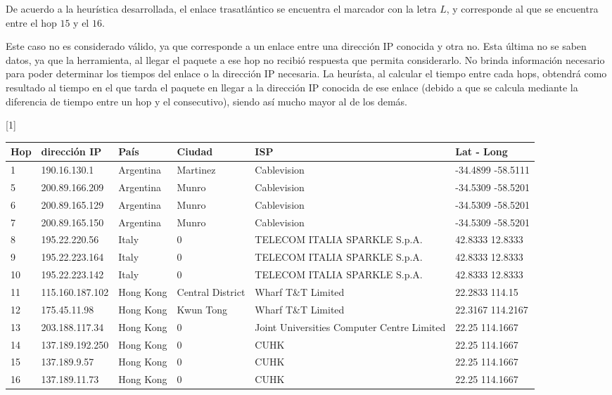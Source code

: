 De acuerdo a la heurística desarrollada, el enlace trasatlántico se encuentra el marcador con la letra $L$, y corresponde al que se encuentra entre el hop $15$ y el $16$. 

Este caso no es considerado válido, ya que corresponde a un enlace entre una dirección IP conocida y otra no. Esta última no se saben datos, ya que la herramienta, al llegar el paquete a ese hop no recibió respuesta que permita considerarlo. No brinda información necesario para poder determinar los tiempos del enlace o la dirección IP necesaria. La heurísta, al calcular el tiempo entre cada hops, obtendrá como resultado al tiempo en el que tarda el paquete en llegar a la dirección IP conocida de ese enlace (debido a que se calcula mediante la diferencia de tiempo entre un hop y el consecutivo), siendo así mucho mayor al de los demás. 


\begin{center}
\scalebox{0.7}[1]{
 \begin{tabular}{|l|l|l|l|l|l|}
    \hline 
    Hop & dirección IP & País & Ciudad & ISP & Lat - Long \\
    \hline
    1 & 190.16.130.1 & Argentina & Martinez & Cablevision & -34.4899 -58.5111	\\
    5 & 200.89.166.209 & Argentina & Munro & Cablevision & -34.5309 -58.5201	\\
    6 & 200.89.165.129 & Argentina & Munro & Cablevision & -34.5309 -58.5201	\\
    7 & 200.89.165.150 & Argentina & Munro & Cablevision & -34.5309 -58.5201	\\
    8 & 195.22.220.56 & Italy & 0 & TELECOM ITALIA SPARKLE S.p.A. & 42.8333 12.8333	\\
    9 & 195.22.223.164 & Italy & 0 & TELECOM ITALIA SPARKLE S.p.A. & 42.8333 12.8333	\\
    10 & 195.22.223.142 & Italy & 0 & TELECOM ITALIA SPARKLE S.p.A. & 42.8333 12.8333 \\
    11 & 115.160.187.102 & Hong Kong & Central District & Wharf T\&T Limited & 22.2833 114.15	\\
    12 & 175.45.11.98 & Hong Kong & Kwun Tong & Wharf T\&T Limited & 22.3167 114.2167	\\
    13 & 203.188.117.34 & Hong Kong & 0 & Joint Universities Computer Centre Limited & 22.25 114.1667	\\
    14 & 137.189.192.250 & Hong Kong & 0 & CUHK & 22.25 114.1667	\\
    15 & 137.189.9.57 & Hong Kong & 0 & CUHK & 22.25 114.1667	\\
    16 & 137.189.11.73 & Hong Kong & 0 & CUHK & 22.25 114.1667	\\
    \hline
 \end{tabular}}
\end{center}

